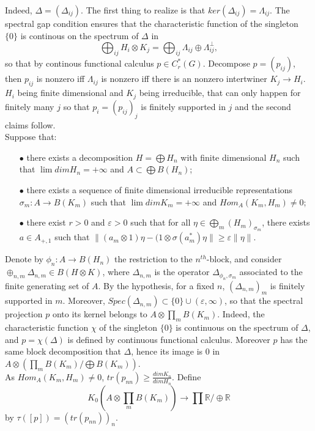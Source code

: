 Indeed, $\Delta= (\Delta_{ij})$.
The first thing to realize is that $ker(\Delta_{ij})=\Lambda_{ij}$. The spectral gap condition ensures that the characteristic function of the singleton $\{0\}$ is continous on the spectrum of $\Delta$ in 
\[\bigoplus_{ij} H_i \otimes K_j = \bigoplus_{ij} \Lambda_{ij} \oplus \Lambda_{ij}^{\perp}, \]
so that by continous functional calculus $p \in C_r^*(G)$. Decompose $p =(p_{ij})$, then $p_{ij}$ is nonzero iff $\Lambda_{ij}$ is nonzero iff there is an nonzero intertwiner $K_j \rightarrow H_i$. $H_i$ being finite dimensional and $K_j$ being irreducible, that can only happen for finitely many $j$ so that $p_i =(p_{ij})_j$ is finitely supported in $j$ and the second claims follow. \\

Suppose that:
\begin{itemize} 
\item[$\bullet$] there exists a decomposition $H=\bigoplus H_n$ with finite dimensional $H_n$ such that $\lim dim H_n = +\infty$ and $A\subset \bigoplus B(H_n)$;
\item[$\bullet$] there exists a sequence of finite dimensional irreducible representations $\sigma_m : A \rightarrow B(K_m)$ such that $\lim dim K_m = +\infty$ and $Hom_A(K_m, H_m) \neq 0$;
\item[$\bullet$] there exist $r>0$ and $\varepsilon >0$ such that for all $\eta \in \bigoplus_m (H_m)_{\sigma_m}$, there exists $a\in A_{+,1}$ such that $\| (a_m\otimes 1)\eta - (1\otimes \sigma(a_m^*)\eta \| \geq \varepsilon \| \eta \|$. 
\end{itemize}

Denote by $\phi_n : A \rightarrow B(H_n)$ the restriction to the $n^{th}$-block, and consider $\oplus_{n,m} \Delta_{n,m} \in B(H\otimes K) $, where $\Delta_{n,m}$ is the operator $\Delta_{\phi_n, \sigma_m}$ associated to the finite generating set of $A$. By the hypothesis, for a fixed $n$, $(\Delta_{n,m})_m$ is finitely supported in $m$. Moreover, $Spec(\Delta_{n,m}) \subset \{0\}\cup (\varepsilon, \infty )$, so that the spectral projection $p$ onto its kernel belongs to $A\otimes \prod_m B(K_m)$. Indeed, the characteristic function $\chi$ of the singleton $\{0\}$ is continuous on the spectrum of $\Delta$, and $p = \chi(\Delta)$ is defined by continuous functional calculus. Moreover $p$ has the same block decomposition that $\Delta$, hence its image is $0$ in $A \otimes (\prod_m B(K_m) / \bigoplus B(K_m))$.\\

As $Hom_A(K_m, H_m) \neq 0$, $tr(p_{nn}) \geq \frac{dim K_n}{dim H_n}$. Define
\[K_0(A\otimes \prod_m B(K_m)) \rightarrow \prod \mathbb R / \oplus \mathbb R\] 
by $\tau([p]) = (tr(p_{nn}))_n$.


